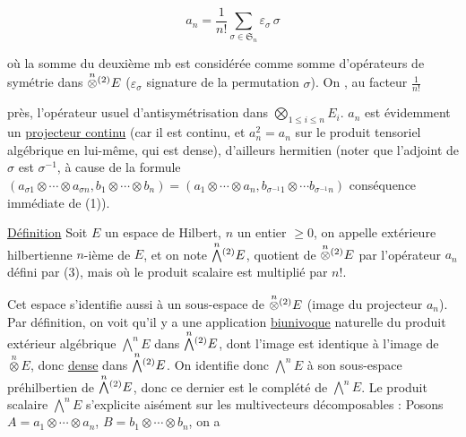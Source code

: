 \[
a_n=\frac1{n!}\sum_{\sigma\in\mathfrak S_n}\varepsilon_\sigma\,\sigma \tag*{(3)}
\]

où la somme du deuxième mb est considérée comme
somme d'opérateurs de symétrie dans $\overset{n}{\otimes}\vphantom{\otimes}^{(2)}E$ ($\varepsilon_\sigma$ signature
de la permutation $\sigma$).  On , au facteur $\frac1{n!}$

près, l'opérateur usuel d'antisymétrisation dans $\bigotimes_{1\leq i\leq n}E_i$. 
 $a_n$ est
évidemment un \uline{projecteur continu} (car il est continu, et
  $a_n^2=a_n$ sur le  produit tensoriel algébrique
en lui-même, qui est dense), d'ailleurs hermitien
(noter que l'adjoint de $\sigma$ est $\sigma^{-1}$, à cause de
la formule $(a_{\sigma1}\otimes\cdots\otimes a_{\sigma n},b_1\otimes\cdots\otimes b_n)=(a_1\otimes\cdots\otimes a_n,b_{\sigma^{-1}1}\otimes\cdots b_{\sigma^{-1}n})$
conséquence immédiate de (1)). 

\uline{Définition} Soit $E$ un espace de Hilbert, $n$ un entier $\geq0$,
on appelle    extérieure hilbertienne $n$-ième de $E$,
et on note $\overset{n}{\bigwedge}\vphantom{\bigwedge}^{(2)}E$,   quotient de $\overset{n}{\otimes}\vphantom{\otimes}^{(2)}E$ par
l'opérateur $a_n$ défini par (3), mais où le produit
scalaire est multiplié par $n!$.

Cet espace s'identifie aussi à  un sous-espace
de $\overset{n}{\otimes}\vphantom{\otimes}^{(2)}E$ (image du projecteur $a_n$). Par définition,
on voit qu'il y a une application \uline{biunivoque}
naturelle du produit extérieur algébrique $\overset{n}{\bigwedge}E$ dans
$\overset{n}{\bigwedge}\vphantom{\bigwedge}^{(2)}E$, dont l'image est identique à l'image de $\overset{n}{\otimes}E$,
donc \uline{dense} dans $\overset{n}{\bigwedge}\vphantom{\bigwedge}^{(2)}E$. On identifie donc $\overset{n}{\bigwedge}E$ à 
son sous-espace préhilbertien de $\overset{n}{\bigwedge}\vphantom{\bigwedge}^{(2)}E$, donc ce dernier
est le complété de $\overset{n}{\bigwedge}E$. Le produit scalaire 
$\overset{n}{\bigwedge}E$ s'explicite aisément  sur les  multivecteurs
décomposables : Posons $A=a_1\otimes\cdots\otimes a_n$, $B=b_1\otimes\cdots\otimes b_n$, on a


